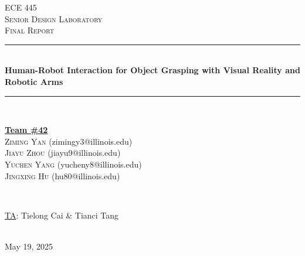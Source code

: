 \documentclass[12pt]{article}
\begin{document}
\begin{titlepage}
\newcommand{\HRule}{\rule{\linewidth}{0.1mm}} 
\center %
 
\textsc{\Large ECE 445}\\[0.5cm] %
\textsc{\large Senior Design Laboratory}\\[0.5cm] %
\textsc{\Large Final Report }\\[0.5cm] %

\HRule \\[0.5cm]
\huge \textbf{Human-Robot Interaction for Object Grasping with Visual Reality and Robotic Arms} %
\HRule \\[2cm]
 
\begin{minipage}{0.5\textwidth}
    \begin{center} \large
        \underline{\textbf{Team \#42}} \\ \medskip
        \textsc{Ziming Yan} (zimingy3@illinois.edu) \\
        \textsc{Jiayu Zhou} (jiayu9@illinois.edu) \\   %
        \textsc{Yuchen Yang} (yucheny8@illinois.edu) \\
        \textsc{Jingxing Hu} (hu80@illinois.edu) \\
    \end{center}
\end{minipage} \\[1.5cm]

\begin{minipage}{0.5\textwidth}
    \begin{center}
        \large
        \underline{TA}: Tielong Cai \& Tianci Tang
    \end{center}
\end{minipage} \\[1cm]

{\large May 19, 2025} %

\vfill %

\end{titlepage}
\setcounter{page}{2}
\clearpage
\tableofcontents
\newpage
\end{document}
